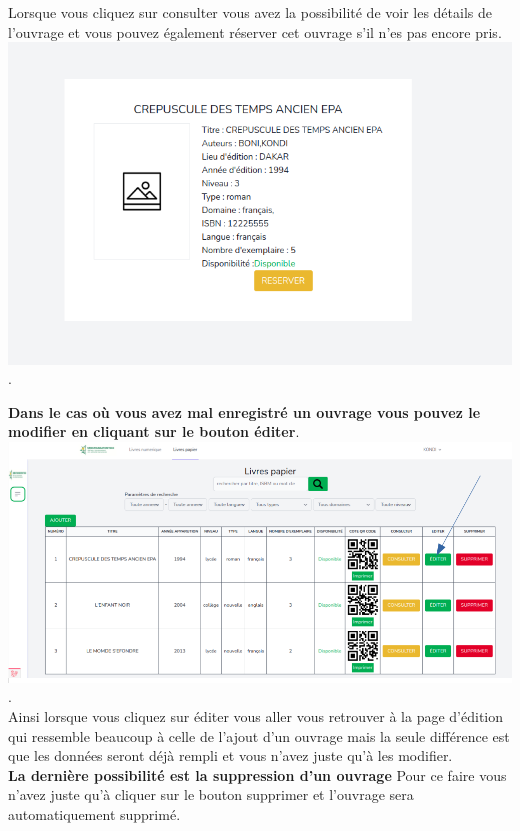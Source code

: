\documentclass[12pt,a4paper]{article}
\begin{document}
Lorsque vous cliquez sur consulter vous avez la possibilité de voir les détails de l'ouvrage et vous pouvez également réserver cet ouvrage s'il n'es pas encore pris.\\

\includegraphics[scale=0.5]{images/ResulConsulter.png}.\\

\newpage

\textbf{Dans le cas où vous avez mal enregistré un ouvrage vous pouvez le modifier en cliquant sur le bouton éditer}.\\

\includegraphics[scale=0.5]{images/ResulEdit.png}.\\

Ainsi lorsque vous cliquez sur éditer vous aller vous retrouver à la page d'édition qui ressemble beaucoup à celle de l'ajout d'un ouvrage mais la seule différence est que les données seront déjà rempli et vous n'avez juste qu'à les modifier. \\

\textbf{La dernière possibilité est la suppression d'un ouvrage}
Pour ce faire vous n'avez juste qu'à cliquer sur le bouton supprimer et l'ouvrage sera automatiquement supprimé.\\
\end{document}
